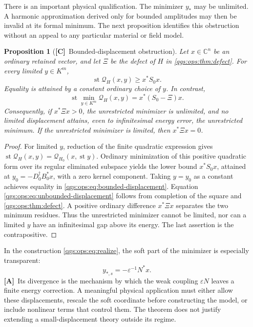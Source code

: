 \documentclass[11pt,oneside]{article}
\numberwithin{equation}{section}
\theoremstyle{plain}
\newtheorem{proposition}[proposition]{Proposition}
\theoremstyle{definition}
\theoremstyle{remark}
\newcommand{\C}{\mathbb C}
\newcommand{\QH}{\mathcal Q_H}
\DeclareMathOperator{\st}{st}
\newcommand{\TC}{\textcolor{TierC}{\textsf{\bfseries[C]}}}
\newcommand{\TA}{\textcolor{TierA}{\textsf{\bfseries[A]}}}
\begin{document}
There is an important physical qualification. The minimizer $y_*$ may be unlimited. A harmonic approximation derived only for bounded amplitudes may then be invalid at its formal minimum. The next proposition identifies this obstruction without an appeal to any particular material or field model.

\begin{proposition}[\TC\ Bounded-displacement obstruction]\label{qgs:ops:prop:displacement}
Let $x\in\C^n$ be an ordinary retained vector, and let $\Xi$ be the defect of $H$ in \cref{qgs:ops:thm:defect}. For every limited $y\in K^m$,
\begin{equation}\label{qgs:ops:eq:bounded-displacement}
 \st\QH(x,y)\ge x^*S_0x.
\end{equation}
Equality is attained by a constant ordinary choice of $y$. In contrast,
\begin{equation}\label{qgs:ops:eq:unbounded-displacement}
 \st\min_{y\in K^m}\QH(x,y)
 =x^*(S_0-\Xi)x.
\end{equation}
Consequently, if $x^*\Xi x>0$, the unrestricted minimizer is unlimited, and no limited displacement attains, even to infinitesimal energy error, the unrestricted minimum. If the unrestricted minimizer is limited, then $x^*\Xi x=0$.
\end{proposition}
\begin{proof}
For limited $y$, reduction of the finite quadratic expression gives $\st\QH(x,y)=\mathcal Q_{H_0}(x,\st y)$. Ordinary minimization of this positive quadratic form over its regular eliminated subspace yields the lower bound $x^*S_0x$, attained at $y_0=-D_0^\dagger B_0^*x$, with a zero kernel component. Taking $y=y_0$ as a constant achieves equality in \eqref{qgs:ops:eq:bounded-displacement}. Equation \eqref{qgs:ops:eq:unbounded-displacement} follows from completion of the square and \cref{qgs:ops:thm:defect}. A positive ordinary difference $x^*\Xi x$ separates the two minimum residues. Thus the unrestricted minimizer cannot be limited, nor can a limited $y$ have an infinitesimal gap above its energy. The last assertion is the contrapositive.
\end{proof}

In the construction \eqref{qgs:ops:eq:realize}, the soft part of the minimizer is especially transparent:
\begin{equation}\label{qgs:ops:eq:soft-displacement}
 y_{*,s}=-\varepsilon^{-1}N^*x.
\end{equation}
\TA\ Its divergence is the mechanism by which the weak coupling $\varepsilon N$ leaves a finite energy correction. A meaningful physical application must either allow these displacements, rescale the soft coordinate before constructing the model, or include nonlinear terms that control them. The theorem does not justify extending a small-displacement theory outside its regime.
\end{document}
